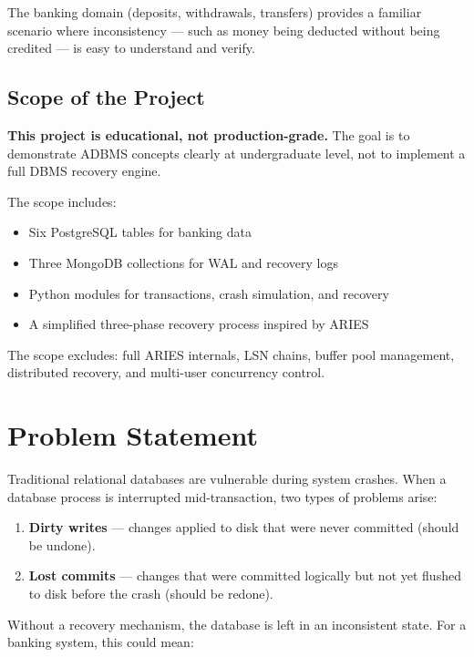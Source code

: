 The banking domain (deposits, withdrawals, transfers) provides a familiar
scenario where inconsistency --- such as money being deducted without being
credited --- is easy to understand and verify.

\section{Scope of the Project}

\begin{conceptbox}
\textbf{This project is educational, not production-grade.}
The goal is to demonstrate ADBMS concepts clearly at undergraduate level,
not to implement a full DBMS recovery engine.
\end{conceptbox}

\noindent The scope includes:
\begin{itemize}
  \item Six PostgreSQL tables for banking data
  \item Three MongoDB collections for WAL and recovery logs
  \item Python modules for transactions, crash simulation, and recovery
  \item A simplified three-phase recovery process inspired by ARIES
\end{itemize}

The scope excludes: full ARIES internals, LSN chains, buffer pool management,
distributed recovery, and multi-user concurrency control.

\chapter{Problem Statement}

Traditional relational databases are vulnerable during system crashes.
When a database process is interrupted mid-transaction, two types of
problems arise:

\begin{enumerate}
  \item \textbf{Dirty writes} --- changes applied to disk that were never
        committed (should be undone).
  \item \textbf{Lost commits} --- changes that were committed logically but
        not yet flushed to disk before the crash (should be redone).
\end{enumerate}

Without a recovery mechanism, the database is left in an inconsistent state.
For a banking system, this could mean:

